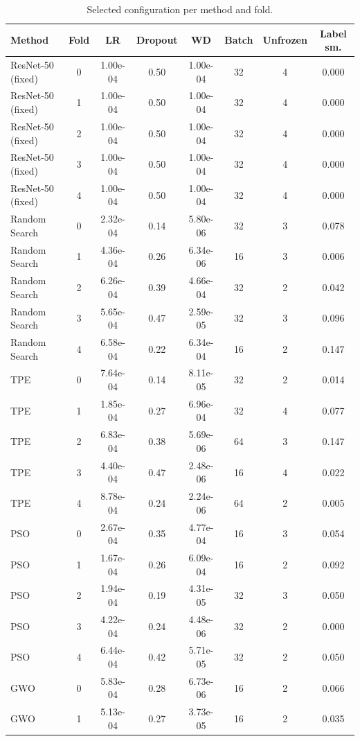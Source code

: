 \begin{table}[t]
\centering
\caption{Selected configuration per method and fold.}
\label{tab:table10_selected_configs}
\small
\begin{tabular}{lccccccc}
\toprule
Method & Fold & LR & Dropout & WD & Batch & Unfrozen & Label sm. \\
\midrule
ResNet-50 (fixed) & 0 & 1.00e-04 & 0.50 & 1.00e-04 & 32 & 4 & 0.000 \\
ResNet-50 (fixed) & 1 & 1.00e-04 & 0.50 & 1.00e-04 & 32 & 4 & 0.000 \\
ResNet-50 (fixed) & 2 & 1.00e-04 & 0.50 & 1.00e-04 & 32 & 4 & 0.000 \\
ResNet-50 (fixed) & 3 & 1.00e-04 & 0.50 & 1.00e-04 & 32 & 4 & 0.000 \\
ResNet-50 (fixed) & 4 & 1.00e-04 & 0.50 & 1.00e-04 & 32 & 4 & 0.000 \\
Random Search & 0 & 2.32e-04 & 0.14 & 5.80e-06 & 32 & 3 & 0.078 \\
Random Search & 1 & 4.36e-04 & 0.26 & 6.34e-06 & 16 & 3 & 0.006 \\
Random Search & 2 & 6.26e-04 & 0.39 & 4.66e-04 & 32 & 2 & 0.042 \\
Random Search & 3 & 5.65e-04 & 0.47 & 2.59e-05 & 32 & 3 & 0.096 \\
Random Search & 4 & 6.58e-04 & 0.22 & 6.34e-04 & 16 & 2 & 0.147 \\
TPE & 0 & 7.64e-04 & 0.14 & 8.11e-05 & 32 & 2 & 0.014 \\
TPE & 1 & 1.85e-04 & 0.27 & 6.96e-04 & 32 & 4 & 0.077 \\
TPE & 2 & 6.83e-04 & 0.38 & 5.69e-06 & 64 & 3 & 0.147 \\
TPE & 3 & 4.40e-04 & 0.47 & 2.48e-06 & 16 & 4 & 0.022 \\
TPE & 4 & 8.78e-04 & 0.24 & 2.24e-06 & 64 & 2 & 0.005 \\
PSO & 0 & 2.67e-04 & 0.35 & 4.77e-04 & 16 & 3 & 0.054 \\
PSO & 1 & 1.67e-04 & 0.26 & 6.09e-04 & 16 & 2 & 0.092 \\
PSO & 2 & 1.94e-04 & 0.19 & 4.31e-05 & 32 & 3 & 0.050 \\
PSO & 3 & 4.22e-04 & 0.24 & 4.48e-06 & 32 & 2 & 0.000 \\
PSO & 4 & 6.44e-04 & 0.42 & 5.71e-05 & 32 & 2 & 0.050 \\
GWO & 0 & 5.83e-04 & 0.28 & 6.73e-06 & 16 & 2 & 0.066 \\
GWO & 1 & 5.13e-04 & 0.27 & 3.73e-05 & 16 & 2 & 0.035 \\

\end{tabular}
\end{table}
